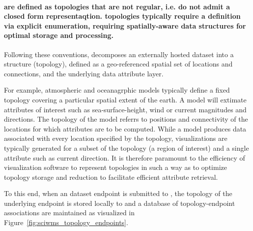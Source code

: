 \paragraph{{\bf \ugrid{}} are defined as topologies that are not regular, i.e. do not admit a closed form representaqtion. \ugrid{} topologies typically require a definition via explicit enumeration, requiring spatially-aware data structures for optimal storage and processing.}

Following these conventions, \sciwms{} decomposes an externally hosted
dataset into a structure (topology), defined as a geo-referenced
spatial set of locations and connections, and the underlying data
attribute layer.

For example, atmospheric and oceanagrphic models typically define a
fixed topology covering a particular spatial extent of the earth. A
model will extimate attributes of interest such as sea-surface-height,
wind or current magnitudes and directions. The topology of the model
referrs to positions and connectivity of the locations for which
attributes are to be computed. While a model produces data associated
with every location specified by the topology, visualizations are
typically generated for a subset of the topology (a region of
interest) and a single attribute such as current direction. It is
therefore paramount to the efficiency of visualization software to
represent topologies in such a way as to optimize topology storage and
reduction to facilitate efficient attribute retrieval. 

To this end, when an dataset endpoint is submitted to \sciwms{}, the
topology of the underlying endpoint is stored locally to \sciwms{} and
a database of topology-endpoint associations are maintained as
visualized in Figure~\ref{fig:sciwms_topology_endpoints}. 

